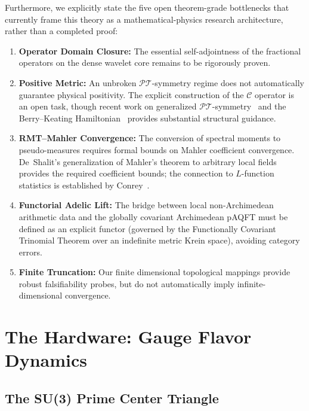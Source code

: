 Furthermore, we explicitly state the five open theorem-grade bottlenecks that currently frame this theory as a mathematical-physics research architecture, rather than a completed proof:
\begin{enumerate}
    \item \textbf{Operator Domain Closure:} The essential self-adjointness of the fractional operators on the dense wavelet core remains to be rigorously proven.
    \item \textbf{Positive Metric:} An unbroken $\mathcal{PT}$-symmetry regime does not automatically guarantee physical positivity. The explicit construction of the $\mathcal{C}$ operator is an open task, though recent work on generalized $\mathcal{PT}$-symmetry~\cite{BenderBerryMandilara2002} and the Berry--Keating Hamiltonian~\cite{BenderBrodyMuller2017} provides substantial structural guidance.
    \item \textbf{RMT--Mahler Convergence:} The conversion of spectral moments to pseudo-measures requires formal bounds on Mahler coefficient convergence. De~Shalit's generalization of Mahler's theorem to arbitrary local fields~\cite{deShalit2016} provides the required coefficient bounds; the connection to $L$-function statistics is established by Conrey~\cite{Conrey_RMT}.
    \item \textbf{Functorial Adelic Lift:} The bridge between local non-Archimedean arithmetic data and the globally covariant Archimedean pAQFT must be defined as an explicit functor (governed by the Functionally Covariant Trinomial Theorem over an indefinite metric Krein space), avoiding category errors.
    \item \textbf{Finite Truncation:} Our finite dimensional topological mappings provide robust falsifiability probes, but do not automatically imply infinite-dimensional convergence.
\end{enumerate}

\section{The Hardware: Gauge Flavor Dynamics}

\subsection{The SU(3) Prime Center Triangle}

